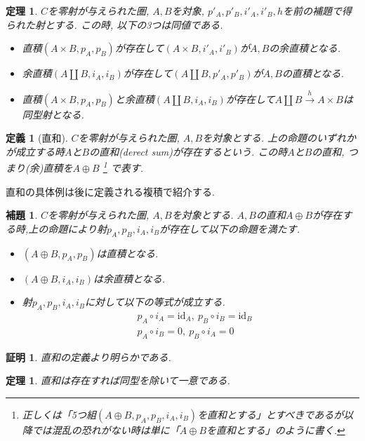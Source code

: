 \documentclass[a4paper,12pt]{ltjsarticle}
\theoremstyle{break}
\newtheorem{defn}[thm]{定義}
\newtheorem{lem}[thm]{補題}
\newtheorem{thrm}[thm]{定理}
\newtheorem*{prf}{証明}
\newcommand{\xr}[1]{\xrightarrow{#1}}
\newcommand{\id}{\mathrm{id}}
\newcommand{\ci}{\circ}
\newcommand{\ti}{\times}
\newcommand{\opl}{\oplus}
\newcommand{\am}{\amalg}
\numberwithin{equation}{section}
\begin{document}
\begin{thrm}
  $C$を零射が与えられた圏, $A,B$を対象, $p'_A,p'_B,i'_A,i'_B,h$を前の補題で得られた射とする. 
  この時, 以下の3つは同値である.
  \begin{itemize}
    \item 直積$(A \ti B,p_A,p_B)$が存在して$(A \ti B,i'_A, i'_B)$が$A,B$の余直積となる.
    \item 余直積$(A \am B,i_A,i_B)$が存在して$(A \am B,p'_A, p'_B)$が$A,B$の直積となる.
    \item 直積$(A \ti B,p_A,p_B)$と余直積$(A \am B,i_A,i_B)$が存在して$A \am B \xr{h} A \ti B$は同型射となる. 
  \end{itemize} 
\end{thrm}

\begin{defn}[直和]
  $C$を零射が与えられた圏, $A,B$を対象とする. 
  上の命題のいずれかが成立する時$A$と$B$の直和(derect sum)が存在するという. 
  この時$A$と$B$の直和, つまり(余)直積を$A \opl B$
  \footnote{
    正しくは「5つ組$(A \opl B,p_A,p_B,i_A,i_B)$を直和とする」とすべきであるが以降では混乱の恐れがない時は単に「$A \opl B$を直和とする」のように書く. 
  }
  で表す. 
\end{defn}

直和の具体例は後に定義される複積で紹介する. 

\begin{lem}
  $C$を零射が与えられた圏, $A,B$を対象とする. 
  $A,B$の直和$A \opl B$が存在する時,上の命題により射$p_A,p_B,i_A,i_B$が存在して以下の命題を満たす. 
  \begin{itemize}
    \item $(A \opl B,p_A,p_B)$は直積となる. 
    \item $(A \opl B,i_A,i_B)$は余直積となる. 
    \item 射$p_A,p_B,i_A,i_B$に対して以下の等式が成立する. 
    \begin{align*}
      &p_A \ci i_A = \id_A, ~ p_B \ci i_B = \id_B \\
      &p_A \ci i_B = 0, ~ p_B \ci i_A = 0
    \end{align*}
  \end{itemize}
\end{lem}

\begin{prf}
  直和の定義より明らかである. 
\end{prf}

\begin{thrm}
  直和は存在すれば同型を除いて一意である. 
\end{thrm}
\end{document}
